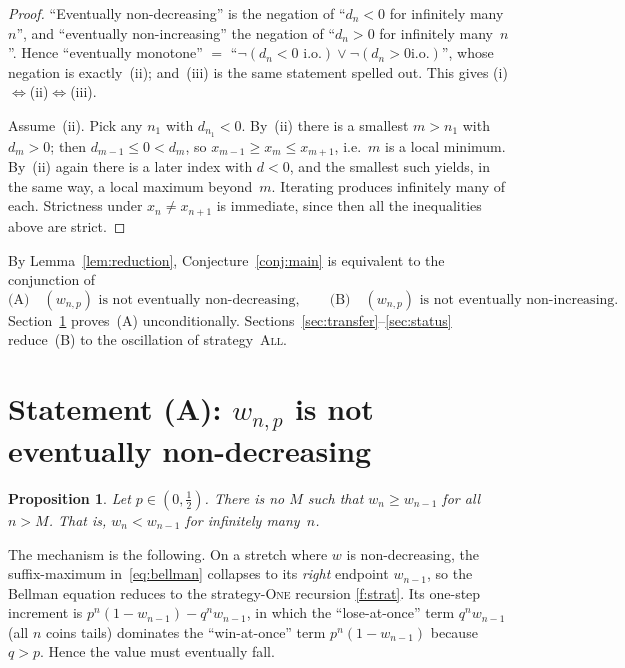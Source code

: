 \documentclass[11pt]{article}
\newtheorem{proposition}[theorem]{Proposition}
\theoremstyle{definition}
\newcommand{\One}{\textsc{One}}
\newcommand{\All}{\textsc{All}}
\begin{document}
\begin{proof}
  ``Eventually non-decreasing'' is the negation of ``$d_n<0$ for
  infinitely many~$n$'', and ``eventually non-increasing'' the
  negation of ``$d_n>0$ for infinitely many~$n$''. Hence ``eventually
  monotone'' $=$ ``$\neg(d_n<0\text{ i.o.})\vee\neg(d_n>0\text{
  i.o.})$'', whose negation is exactly~(ii); and~(iii) is the same
  statement spelled out. This gives (i)$\iff$(ii)$\iff$(iii).

  Assume~(ii). Pick any $n_1$ with $d_{n_1}<0$. By~(ii) there is a
  smallest $m>n_1$ with $d_m>0$; then $d_{m-1}\le 0<d_m$, so
  $x_{m-1}\ge x_m\le x_{m+1}$, i.e.\ $m$ is a local minimum.
  By~(ii) again there is a later index with $d<0$, and the smallest
  such yields, in the same way, a local maximum beyond~$m$. Iterating
  produces infinitely many of each. Strictness under $x_n\ne x_{n+1}$
  is immediate, since then all the inequalities above are strict.
\end{proof}

By Lemma~\ref{lem:reduction}, Conjecture~\ref{conj:main} is equivalent
to the conjunction of
\begin{equation}\label{eq:two}
  \text{(A)}\quad (w_{n,p})\text{ is not eventually non-decreasing},
  \qquad
  \text{(B)}\quad (w_{n,p})\text{ is not eventually non-increasing}.
\end{equation}
Section~\ref{sec:A} proves~(A) unconditionally.
Sections~\ref{sec:transfer}--\ref{sec:status} reduce~(B) to the
oscillation of strategy~\All.

\section{Statement (A): \texorpdfstring{$w_{n,p}$}{w(n,p)} is not
  eventually non-decreasing}\label{sec:A}

\begin{proposition}\label{prop:A}
  Let $p\in(0,\tfrac12)$. There is no $M$ such that $w_{n}\ge w_{n-1}$
  for all $n>M$. That is, $w_n<w_{n-1}$ for infinitely many~$n$.
\end{proposition}

The mechanism is the following. On a stretch where $w$ is
non-decreasing, the suffix-maximum in~\eqref{eq:bellman} collapses to
its \emph{right} endpoint $w_{n-1}$, so the Bellman equation reduces to
the strategy-\One{} recursion \ref{f:strat}. Its one-step increment is
$p^n(1-w_{n-1})-q^n w_{n-1}$, in which the ``lose-at-once'' term
$q^n w_{n-1}$ (all $n$ coins tails) dominates the ``win-at-once'' term
$p^n(1-w_{n-1})$ because $q>p$. Hence the value must eventually fall.
\end{document}
